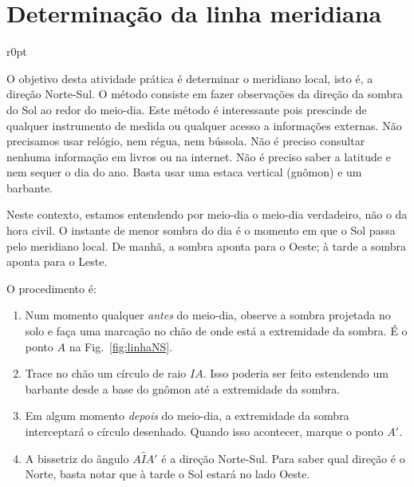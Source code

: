 \chapter{Determinação da linha meridiana}
\label{cap:meridiano}

\begin{wrapfigure}{r}{0pt}
\centering

\caption{Determinação da linha Norte-Sul.}
\label{fig:linhaNS}
\end{wrapfigure}

O objetivo desta atividade prática é determinar o meridiano local, isto é, a direção Norte-Sul. O método consiste em fazer observações da direção da sombra do Sol ao redor do meio-dia. Este método é interessante pois prescinde de qualquer instrumento de medida ou qualquer acesso a informações externas. Não precisamos usar relógio, nem régua, nem bússola. Não é preciso consultar nenhuma informação em livros ou na internet. Não é preciso saber a latitude e nem sequer o dia do ano. Basta usar uma estaca vertical (gnômon) e um barbante.

Neste contexto, estamos entendendo por meio-dia o meio-dia verdadeiro, não o da hora civil. O instante de menor sombra do dia é o momento em que o Sol passa pelo meridiano local. De manhã, a sombra aponta para o Oeste; à tarde a sombra aponta para o Leste.

O procedimento é:

\begin{enumerate}

\item Num momento qualquer \textit{antes} do meio-dia, observe a sombra projetada no solo e faça uma marcação no chão de onde está a extremidade da sombra. É o ponto $A$ na Fig.~\ref{fig:linhaNS}.

\item Trace no chão um círculo de raio $IA$. Isso poderia ser feito estendendo um barbante desde a base do gnômon até a extremidade da sombra.

\item Em algum momento \textit{depois} do meio-dia, a extremidade da sombra interceptará o círculo desenhado. Quando isso acontecer, marque o ponto $A'$.

\item A bissetriz do ângulo $A\hat{I}A'$ é a direção Norte-Sul. Para saber qual direção é o Norte, basta notar que à tarde o Sol estará no lado Oeste.

\end{enumerate}

